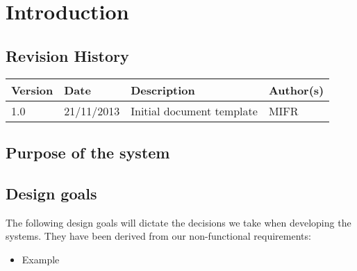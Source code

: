 \chapter{Introduction}
\label{sec:introduction}

\section{Revision History}
\begin{center}
    \begin{tabular}{ | l | l | p{6cm} | p{4cm} |}
    \hline
    Version & Date & Description & Author(s) 
    \\ \hline
    1.0 & 21/11/2013 & Initial document template & MIFR
    \\ \hline
    \end{tabular}
\end{center}

\section{Purpose of the system}

\section{Design goals}
The following design goals will dictate the decisions we take when developing the systems. They have been derived from our non-functional requirements:

\begin{itemize}
\item Example
\end{itemize}



